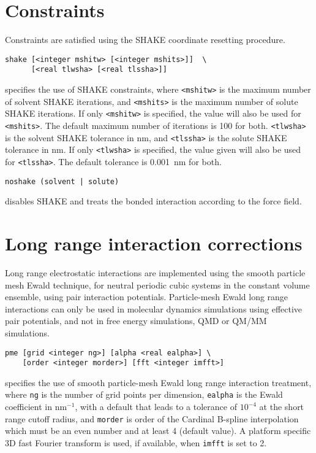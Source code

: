 \section{Constraints}
Constraints are satisfied using the SHAKE 
coordinate resetting procedure.
\begin{description}

\item
\begin{verbatim}
shake [<integer mshitw> [<integer mshits>]]  \
      [<real tlwsha> [<real tlssha>]]
\end{verbatim}
specifies the use of SHAKE constraints,
where \verb+<mshitw>+ is the maximum number of solvent SHAKE iterations,
and \verb+<mshits>+ is the maximum number of solute SHAKE iterations. If
only \verb+<mshitw>+ is specified, the value will also be used for \verb+<mshits>+.
The default maximum number of iterations is 100 for both.
\verb+<tlwsha>+ is the solvent SHAKE tolerance in nm, and \verb+<tlssha>+ is
the solute SHAKE tolerance in nm. If only \verb+<tlwsha>+ is specified, the
value given will also be used for \verb+<tlssha>+. The default tolerance
is 0.001~nm for both.

\item
\begin{verbatim}
noshake (solvent | solute)
\end{verbatim}
disables SHAKE and treats the bonded interaction according to the force 
field.

\end{description}

\section{Long range interaction corrections}
Long range electrostatic interactions are implemented using the
smooth particle mesh Ewald technique, for neutral periodic cubic systems in
the constant volume ensemble, using pair interaction potentials. Particle-mesh
Ewald long range interactions can only be used in molecular dynamics simulations
using effective pair potentials, and not in free energy simulations, QMD or
QM/MM simulations.

\begin{description}
\item
\begin{verbatim}
pme [grid <integer ng>] [alpha <real ealpha>] \
    [order <integer morder>] [fft <integer imfft>] 
\end{verbatim}
specifies the use of smooth particle-mesh Ewald long range
interaction treatment,
where \verb+ng+ is the number of grid points per dimension, 
\verb+ealpha+ is the Ewald coefficient in nm$^{-1}$, with a default
that leads to a tolerance of $10^{-4}$ at the short range cutoff radius, 
and \verb+morder+ is order of the Cardinal B-spline
interpolation which must be an even number and at least 4 (default
value). A platform specific 3D fast Fourier transform is used, if
available, when \verb+imfft+ is set to 2.
\end{description}


